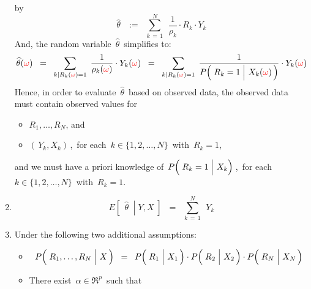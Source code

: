 \begin{proposition}
\begin{enumerate}
	by
	\begin{equation*}
	\widehat{\theta}
	\,\;\; := \;\;
		\overset{N}{\underset{k\,=\,1}{\sum}}\;\,
		\dfrac{1}{\rho_{k}} \cdot R_{k} \cdot Y_{k}
	\end{equation*}
	And, the random variable \,$\widehat{\theta}$\, simplifies to:
	\begin{equation*}
	\widehat{\theta}({\color{red}\omega})
	\;\; = \;\;
		\underset{k\vert R_{k}({\color{red}\omega})=1}{\sum}\;\,
		\dfrac{1}{\rho_{k}({\color{red}\omega})} \cdot Y_{k}({\color{red}\omega})
	\;\; = \;\;
		\underset{k\vert R_{k}({\color{red}\omega})=1}{\sum}\;\,
		\dfrac{
			1
			}{
			P\!\left(\,
				\left.\overset{{\color{white}.}}{R}_{k}=1
				\;\right\vert\,
				X_{k}({\color{red}\omega})
				\,\right)
			}
		\cdot
		Y_{k}({\color{red}\omega})
	\end{equation*}
	Hence, in order to evaluate \,$\widehat{\theta}$\, based on observed data,
	the observed data must contain observed values for
	\begin{itemize}
	\item
		$R_{1}, \ldots, R_{N}$, and
	\item
		$(\,Y_{k},X_{k})$\,,\, for each \,$k \in \{1,2,\ldots,N\}$\, with \,$R_{k} = 1$,
	\end{itemize}
	and we must have a priori knowledge of 
	\,$P\!\left(\,\left.\overset{{\color{white}.}}{R}_{k}=1\;\right\vert\,X_{k}\right)$\,,\,
	for each \,$k \in \{1,2,\ldots,N\}$\, with \,$R_{k} = 1$.
\item
	\begin{equation*}
	E\!\left[\;\,\left.\widehat{\theta}\;\;\right\vert\;Y,X\;\right]
	\;\; = \;\;
		\overset{N}{\underset{k\,=\,1}{\sum}}\;\, Y_{k}	
	\end{equation*}
\item
	Under the following two additional assumptions:
	\begin{itemize}
	\item
		\begin{equation*}
		P\!\left(\,\left.\overset{{\color{white}.}}{R}_{1},\ldots,R_{N} \;\right\vert\, X\,\right)
		\;\; = \;\;
		P\!\left(\,\left.\overset{{\color{white}.}}{R}_{1} \;\right\vert\, X_{1}\,\right)
		\cdot
		P\!\left(\,\left.\overset{{\color{white}.}}{R}_{2} \;\right\vert\, X_{2}\,\right)
		\cdot
		P\!\left(\,\left.\overset{{\color{white}.}}{R}_{N} \;\right\vert\, X_{N}\,\right)
		\end{equation*}
	\item
		There exist \,$\alpha \in \Re^{p}$\, such that
		\begin{eqnarray*}

\end{eqnarray*}
\end{itemize}
\end{enumerate}
\end{proposition}
